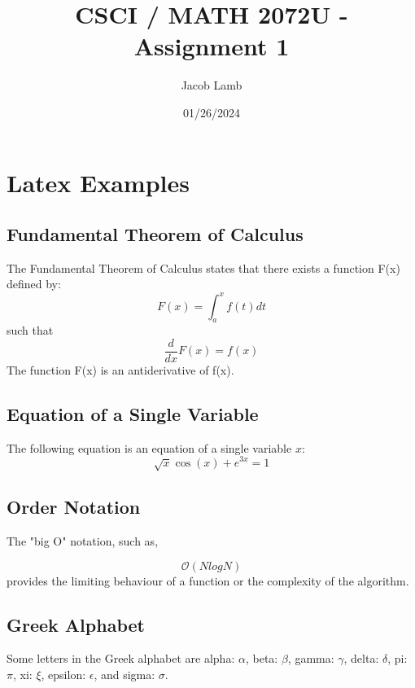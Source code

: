 \documentclass{article}
\title{CSCI / MATH 2072U - Assignment 1}
\author{ Jacob Lamb}         %
\date{ 01/26/2024 }           %
\begin{document}
\maketitle

\section{Latex Examples}

\subsection{Fundamental Theorem of Calculus}
 
The Fundamental Theorem of Calculus states that there exists a function F(x) defined by:
$$
F(x)=\int_{a}^{x} f(t)dt
$$
such that
$$
\frac{d}{dx}F(x)=f(x)
$$
The function F(x) is an antiderivative of f(x).

\subsection{Equation of a Single Variable}
  
The following equation is an equation of a single variable $x$:
$$
\sqrt{x}\cos(x)+e^{3x}=1
$$  

\subsection{Order Notation}
 
The "big O" notation, such as,

$$
\mathcal{O}(NlogN)
$$  
provides the limiting behaviour of a function or the complexity of the algorithm.

\subsection{Greek Alphabet}
 
Some letters in the Greek alphabet are alpha: $\alpha$, beta: $\beta$, gamma: $\gamma$, delta: $\delta$, pi: $\pi$, xi: $\xi$, epsilon: $\epsilon$, and sigma: $\sigma$.
\end{document}
